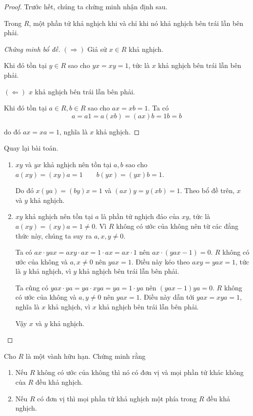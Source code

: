 \begin{proof}
    Trước hết, chúng ta chứng minh nhận định sau.

    Trong $R$, một phần tử khả nghịch khi và chỉ khi nó khả nghịch bên trái lẫn bên phải.
    \begin{proof}[Chứng minh bổ đề]
        $(\Rightarrow)$ Giả sử $x\in R$ khả nghịch.

        Khi đó tồn tại $y\in R$ sao cho $yx = xy = 1$, tức là $x$ khả nghịch bên trái lẫn bên phải.

        $(\Leftarrow)$ $x$ khả nghịch bên trái lẫn bên phải.

        Khi đó tồn tại $a\in R, b\in R$ sao cho $ax = xb = 1$. Ta có
        $$
            a = a1 = a(xb) = (ax)b = 1b = b
        $$

        do đó $ax = xa = 1$, nghĩa là $x$ khả nghịch.
    \end{proof}

    Quay lại bài toán.
    
    \begin{enumerate}[label = (\alph*)]
        \item $xy$ và $yx$ khả nghịch nên tồn tại $a, b$ sao cho $a(xy) = (xy)a = 1\qquad b(yx) = (yx)b = 1$.

              Do đó $x(ya) = (by)x = 1$ và $(ax)y = y(xb) = 1$. Theo bổ đề trên, $x$ và $y$ khả nghịch.
        \item $xy$ khả nghịch nên tồn tại $a$ là phần tử nghịch đảo của $xy$, tức là $a(xy) = (xy)a = 1\ne 0$. Vì $R$ không có ước của không nên từ các đẳng thức này, chúng ta suy ra $a, x, y\ne 0$.

              Ta có $ax\cdot yax = axy\cdot ax = 1\cdot ax = ax\cdot 1$ nên $ax\cdot (yax - 1) = 0$. $R$ không có ước của không và $a, x\ne 0$ nên $yax = 1$. Điều này kéo theo $axy = yax = 1$, tức là $y$ khả nghịch, vì $y$ khả nghịch bên trái lẫn bên phải.

              Ta cũng có $yax\cdot ya = ya\cdot xya = ya = 1\cdot ya$ nên $(yax - 1)ya = 0$. $R$ không có ước của không và $a, y\ne 0$ nên $yax = 1$. Điều này dẫn tới $yax = xya = 1$, nghĩa là $x$ khả nghịch, vì $x$ khả nghịch bên trái lẫn bên phải.
              
              Vậy $x$ và $y$ khả nghịch.
    \end{enumerate}
\end{proof}

\begin{exercise}Cho $R$ là một vành hữu hạn. Chứng minh rằng
    \begin{enumerate}[label = (\alph*)]
        \item Nếu $R$ không có ước của không thì nó có đơn vị và mọi phần tử khác không của $R$ đều khả nghịch.
        \item Nếu $R$ có đơn vị thì mọi phần tử khả nghịch một phía trong $R$ đều khả nghịch.
    \end{enumerate}
\end{exercise}

